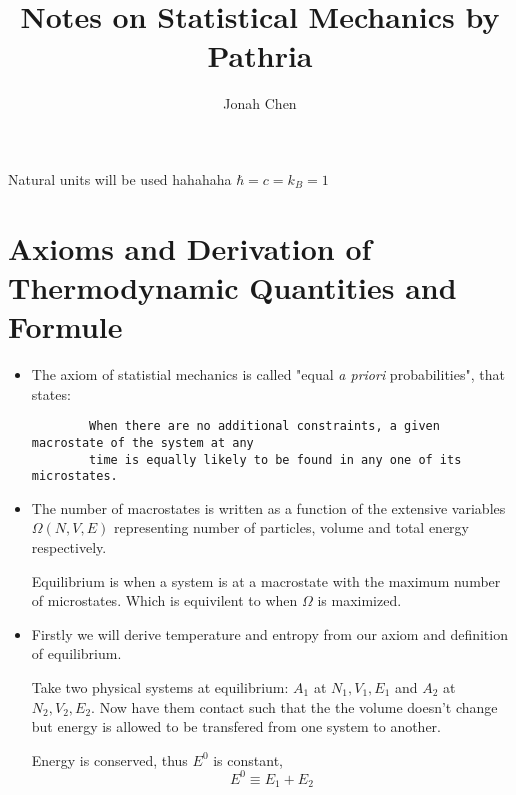 \documentclass{article}
\title{Notes on Statistical Mechanics by Pathria}
\author{Jonah Chen}
\begin{document}
\maketitle
\tableofcontents
Natural units will be used hahahaha $\hbar=c=k_B=1$
\section{Axioms and Derivation of Thermodynamic Quantities and Formule}
\begin{itemize}
    \item The axiom of statistial mechanics is called "equal \textit{a priori} probabilities", that states:
    \begin{verbatim}
        When there are no additional constraints, a given macrostate of the system at any
        time is equally likely to be found in any one of its microstates.
    \end{verbatim}

    \item The number of macrostates is written as a function of the extensive variables $\Omega(N,V,E)$ representing number of particles, volume and total energy respectively. 

    \begin{definition}
        Equilibrium is when a system is at a macrostate with the maximum number of microstates. Which is equivilent to when $\Omega$ is maximized.
    \end{definition}

    \item Firstly we will derive temperature and entropy from our axiom and definition of equilibrium.
    \begin{derivation}
        Take two physical systems at equilibrium: $A_1$ at $N_1, V_1, E_1$  and $A_2$ at $N_2, V_2, E_2$. Now have them contact such that the the volume doesn't change but energy is allowed to be transfered from one system to another.

        Energy is conserved, thus $E^0$ is constant,
        \begin{equation}
            E^0\equiv E_1+E_2 \label{1}
        \end{equation}


\end{derivation}
\end{itemize}
\end{document}
